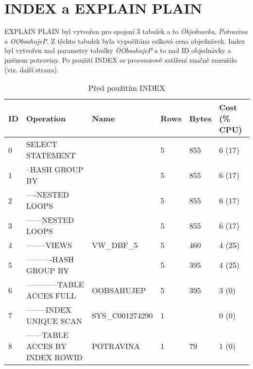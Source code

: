 \documentclass[11pt, a4paper]{article}[]
\begin{document}
    \section{INDEX a EXPLAIN PLAIN}
    EXPLAIN PLAIN byl vytvořen pro spojení 3 tabulek a to \textit{Objednavka}, \textit{Potravina}
    a \textit{OObsahujeP}. Z těchto tabulek byla vypočítána celková cena objednávek.
    Index byl vytvořen nad parametry tabulky \textit{OObsahujeP} a to nad ID objednávky
    a jménem potraviny. Po použití INDEX se procesorové zatížení značně zmenšilo
    (viz. další strana).
\pagebreak
    \begin{table}[h]
	\caption{Před použitím INDEX}
	\centering
	\begin{tabular}{|l|l|l|l|l|l|}
        \hline
        ID & Operation                        & Name            & Rows & Bytes & Cost (\% CPU) \\ \hline
        0  & SELECT STATEMENT                 &                 & 5    & 855   & 6 (17)        \\
        1  & --HASH GROUP BY                  &                 & 5    & 855   & 6 (17)        \\
        2  & ----NESTED LOOPS                 &                 & 5    & 855   & 6 (17)        \\
        3  & ------NESTED LOOPS               &                 & 5    & 855   & 6 (17)        \\
        4  & --------VIEWS                    & VW\_DBF\_5      & 5    & 460   & 4 (25)        \\
        5  & ----------HASH GROUP BY          &                 & 5    & 395   & 4 (25)        \\
        6  & ------------TABLE ACCES FULL     & OOBSAHUJEP      & 5    & 395   & 3 (0)         \\
        7  & --------INDEX UNIQUE SCAN        & SYS\_C001274290 & 1    &       & 0 (0)         \\
        8  & ------TABLE ACCES BY INDEX ROWID & POTRAVINA       & 1    & 79    & 1 (0)         \\ \hline
        \end{tabular}
        \end{table}
\end{document}
